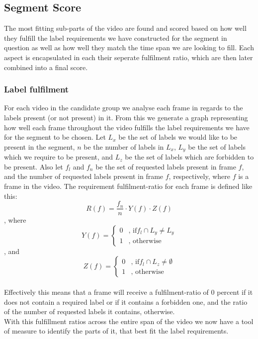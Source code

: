 \subsection{Segment Score}\label{sec:segment_score}
%
%
The most fitting sub-parts of the video are found and scored based on how well they fulfill the label requirements we have constructed for the segment in question as well as how well they match the time span we are looking to fill. Each aspect is encapsulated in each their seperate fulfilment ratio, which are then later combined into a final score.
%
\subsubsection{Label fulfilment}
%
For each video in the candidate group we analyse each frame in regards to the labels present (or not present) in it. From this we generate a graph representing how well each frame throughout the video fulfills the label requirements we have for the segment to be chosen. Let $L_{x}$ be the set of labels we would like to be present in the segment, $n$ be the number of labels in $L_{x}$, $L_{y}$ be the set of labels which we require to be present, and $L_{z}$ be the set of labels which are forbidden to be present. Also let $f_{l}$ and $f_{n}$ be the set of requested labels present in frame $f$, and the number of requested labels present in frame $f$, respectively, where $f$ is a frame in the video. The requirement fulfilment-ratio for each frame is defined like this:\\
%
\begin{equation}
R(f) = \frac{f_{n}}{n} \cdot Y(f) \cdot Z(f)
\end{equation} 
%
, where\\
%
\begin{equation}
Y(f) =
\begin{cases}
0 & \text{, if} f_{l} \cap L_{y} \neq L_{y}\\
1 &  \text{, otherwise}
\end{cases}
\end{equation} 
%
, and\\
%
\begin{equation}
Z(f) =
\begin{cases}
0 & \text{, if} f_{l} \cap L_{z} \neq \emptyset\\
1 &  \text{, otherwise}
\end{cases}
\end{equation} 
%
\\
%
Effectively this means that a frame will receive a fulfilment-ratio of 0 percent if it does not contain a required label or if it contains a forbidden one, and the ratio of the number of requested labels it contains, otherwise.\\
%
With this fulfillment ratios across the entire span of the video we now have a tool of measure to identify the parts of it, that best fit the label requirements.
%
